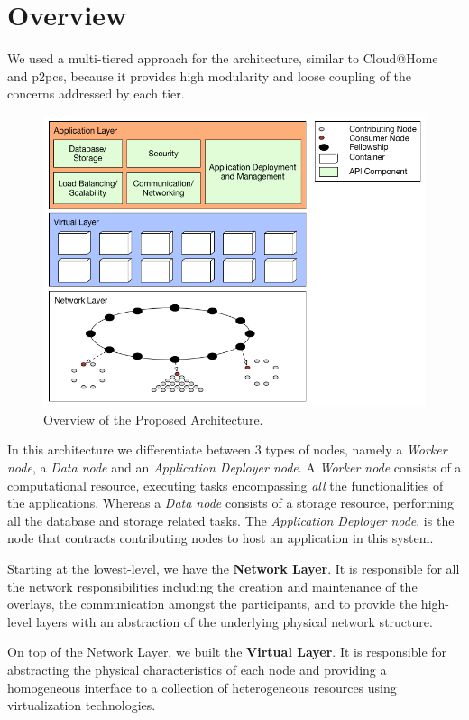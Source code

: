 \documentclass[12pt, titlepage]{uo_temp}
\begin{document}
     \section{Overview}\label{arch_over}
     We used a multi-tiered approach for the architecture, similar to Cloud@Home and
     \gls{p2pcs}, because it provides high modularity and loose coupling of the concerns
     addressed by each tier.
     \begin{figure}[h]
       \centering
       \includegraphics[width=125mm]{images/overview_arch.png}
       \caption{Overview of the Proposed Architecture.}
     \end{figure}
     In this architecture we differentiate between 3 types of nodes, namely a \emph{Worker
       node}, a \emph{Data node} and an \emph{Application Deployer node}. A \emph{Worker
       node} consists of a computational resource, executing tasks encompassing \emph{all}
     the functionalities of the applications. Whereas a \emph{Data node} consists of a
     storage resource, performing all the database and storage related tasks. The
     \emph{Application Deployer node}, is the node that contracts contributing nodes to
     host an application in this system.

     Starting at the lowest-level, we have the \textbf{Network Layer}. It is responsible
     for all the network responsibilities including the creation and maintenance of the
     overlays, the communication amongst the participants, and to provide the high-level
     layers with an abstraction of the underlying physical network structure.

     On top of the Network Layer, we built the \textbf{Virtual Layer}. It is
     responsible for abstracting the physical characteristics of each node and providing a
     homogeneous interface to a collection of heterogeneous resources using virtualization
     technologies. 
\end{document}
